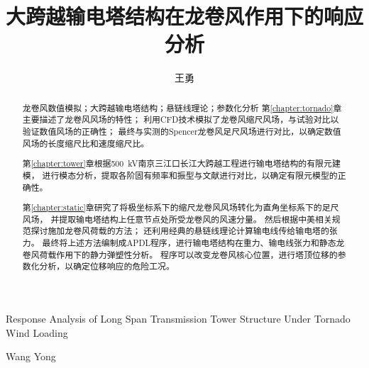 \documentclass[algorithmlist,figurelist,tablelist,nomlist,masters]{seuthesix}
\begin{document}
\title{大跨越输电塔结构在龙卷风作用下的响应分析}{}{Response Analysis of Long Span Transmission Tower Structure Under Tornado Wind Loading}{}
\author{王勇}{Wang Yong}
\authorizedate{\today}
\committeechair{}
\reviewer{}{}

\makebigcover
\makecover

\begin{abstract}{龙卷风数值模拟；大跨越输电塔结构；悬链线理论；参数化分析}
第\ref{chapter:tornado}章主要描述了龙卷风风场的特性；
利用CFD技术模拟了龙卷风缩尺风场，与试验对比以验证数值风场的正确性；
最终与实测的Spencer龙卷风足尺风场进行对比，以确定数值风场的长度缩尺比和速度缩尺比。

第\ref{chapter:tower}章根据\SI{500}{kV}南京三江口长江大跨越工程进行输电塔结构的有限元建模，
进行模态分析，提取各阶固有频率和振型与文献进行对比，以确定有限元模型的正确性。

第\ref{chapter:static}章研究了将极坐标系下的缩尺龙卷风风场转化为直角坐标系下的足尺风场，
并提取输电塔结构上任意节点处所受龙卷风的风速分量。
然后根据中美相关规范探讨施加龙卷风荷载的方法；
还利用经典的悬链线理论计算输电线传给输电塔的张力。
最终将上述方法编制成APDL程序，进行输电塔结构在重力、输电线张力和静态龙卷风荷载作用下的静力弹塑性分析。
程序可以改变龙卷风核心位置，进行塔顶位移的参数化分析，以确定位移响应的危险工况。

\end{abstract}

\begin{englishabstract}{}
\end{englishabstract}

\tableofcontents

\mainmatter








% 
% 
% 
\end{document}
